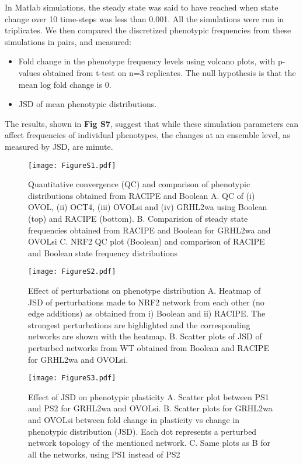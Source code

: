 \documentclass[preprint,review,12pt]{elsarticle}
\begin{document}
{{	In Matlab simulations, the steady state was said to have reached when state change over 10 time-steps was less than 0.001. All the simulations were run in triplicates. We then compared the discretized phenotypic frequencies from these simulations in pairs, and measured:
	\begin{itemize}
	    \item Fold change in the phenotype frequency levels using volcano plots, with p-values obtained from t-test on n=3 replicates. The null hypothesis is that the mean log fold change is 0.
	    \item JSD of mean phenotypic distributions.
	\end{itemize}
	The results, shown in \textbf{Fig S7}, suggest that while these simulation parameters can affect frequencies of individual phenotypes, the changes at an ensemble level, as measured by JSD, are minute. 
	}\color{black}
    
    
    \newpage
	
		\begin{figure}[!ht]
			\centering
			\texttt{[image: FigureS1.pdf]}
			\caption{Quantitative convergence (QC) and comparison of phenotypic distributions obtained from RACIPE and Boolean
				A.	QC of (i) OVOL, (ii) OCT4, (iii) OVOLsi and (iv) GRHL2wa using  Boolean (top) and RACIPE (bottom). 
				B.	Comparision of steady state frequencies obtained from RACIPE and Boolean for GRHL2wa and OVOLsi
				C.	NRF2 QC plot (Boolean) and comparison of RACIPE and Boolean state frequency distributions
			}
			\label{figureS1}
		\end{figure}
		
		\begin{figure}[!ht]
			\centering
			\texttt{[image: FigureS2.pdf]}
			\caption{Effect of perturbations on phenotype distribution
				A.	Heatmap of JSD of perturbations made to NRF2 network from each other (no edge additions) as obtained from i) Boolean and ii) RACIPE. The strongest perturbations are highlighted and the corresponding networks are shown with the heatmap.
				B.	Scatter plots of JSD of perturbed networks from WT obtained from Boolean and RACIPE for GRHL2wa and OVOLsi.
			}
			\label{figureS2}
		\end{figure}
		
		\begin{figure}[!ht]
			\centering
			\texttt{[image: FigureS3.pdf]}
			\caption{Effect of JSD on phenotypic plasticity
				A.	Scatter plot between PS1 and PS2 for GRHL2wa and OVOLsi.
				B.	Scatter plots for GRHL2wa and OVOLsi between fold change in plasticity vs change in phenotypic distribution (JSD). Each dot represents a perturbed network topology of the mentioned network.
				C.	Same plots as B for all the networks, using PS1 instead of PS2
			}
			\label{figureS3}
		\end{figure}
		
}
\end{document}
